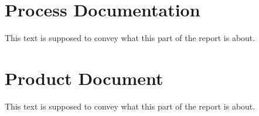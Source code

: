 \documentclass[14pt, a4paper, english]{report}
\begin{document}
	\part{Process Documentation}
	This text is supposed to convey what this part of the report is about.
	
	
	\part{Product Document}
	This text is supposed to convey what this part of the report is about.
	
	
%	

	
%	
%	
%	
	
	\clearpage
    \printbibliography
    \appendix
    
\end{document}
